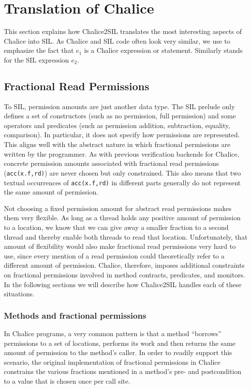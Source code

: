 
\section{Translation of Chalice}\label{sct:trans}

This section explains how Chalice2SIL translates the most interesting aspects of Chalice into SIL. As Chalice and SIL code often look very similar, we use  to emphasize the fact that $e_1$ is a Chalice expression or statement.
Similarly  stands for the SIL expression $e_2$.

\subsection{Fractional Read Permissions}\label{sct:frp}
To SIL, permission amounts are just another data type. 
The SIL prelude only defines a set of constructors (such as no permission, full permission) and some operators and predicates (such as permission addition, subtraction, equality, comparison). 
In particular, it does not specify how permissions are represented. 
This aligns well with the abstract nature in which fractional permissions are written by the programmer.
As with previous verification backends for Chalice, concrete permission amounts associated with fractional read permissions (\lstinline!acc(x.f,rd)!) are never chosen but only constrained. 
This also means that two textual occurrences of \lstinline!acc(x.f,rd)! in different parts generally do not represent the same amount of permission.

Not choosing a fixed permission amount for abstract read permissions makes them very flexible.
As long as a thread holds any positive amount of permission to a location, we know that we can give away a smaller fraction to a second thread and thereby enable both threads to read that location.
Unfortunately, that amount of flexibility would also make fractional read permissions very hard to use, since every mention of a read permission could theoretically refer to a different amount of permission.
Chalice, therefore, imposes additional constraints on fractional permissions involved in method contracts, predicates, and monitors.
In the following sections we will describe how Chalice2SIL handles each of these situations.

\subsubsection{Methods and fractional permissions}\label{sct:meth}
In Chalice programs, a very common pattern is that a method ``borrows'' permissions to a set of locations, performs its work and then returns the same amount of permission to the method's caller.
In order to readily support this scenario, the original implementation of fractional permissions in Chalice constrains the various fractions mentioned in a method's pre- and postcondition to a value that is chosen once per call site.

